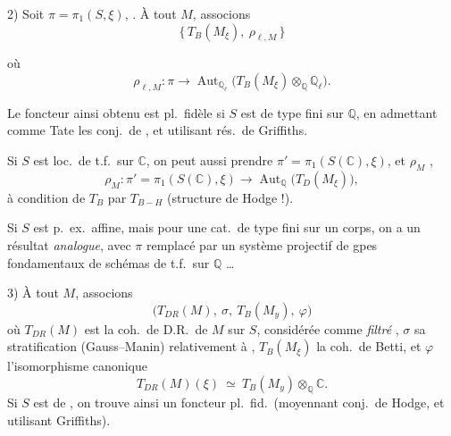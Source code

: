 \documentclass[11pt,a4paper]{article}
\begin{document}
2) Soit $\pi = \pi_{1}(S, \xi)$, . À tout $M$,
associons
\[ \{\, T_{B}(M_{\xi}),\ \rho_{\ell, M} \,\} \]

 où
\[ \rho_{\ell, M} : \pi \longrightarrow \operatorname{Aut}_{\mathbb{Q}_{\ell}}
\bigl( T_{B}(M_{\xi}) \otimes_{\mathbb{Q}} \mathbb{Q}_{\ell} \bigr) . \]


Le foncteur ainsi obtenu est pl.\ fidèle si $S$  est de type fini sur $\mathbb{Q}$, en admettant
comme  Tate les conj.\ de , et utilisant rés.\ de
Griffiths.

Si $S$ est loc.\ de t.f.\ sur $\mathbb{C}$, on peut aussi prendre
$\pi' = \pi_{1}(S(\mathbb{C}), \xi)$, et $\rho_{M}$ ,
\[ \rho_{M} : \pi' = \pi_{1}(S(\mathbb{C}), \xi) \longrightarrow
\operatorname{Aut}_{\mathbb{Q}} \bigl( T_{D}(M_{\xi}) \bigr) , \]
à condition de  $T_{B}$ par $T_{B-H}$ (structure de Hodge !).


Si $S$ est p.\ ex.\ affine, \struck{\ill{}} mais pour une cat.\ de type fini sur
un corps, on a un résultat \emph{analogue}, avec $\pi$ remplacé par un système
projectif de gpes fondamentaux de schémas de t.f.\ sur $\mathbb{Q}$ …

3) À tout $M$, associons
\[ \bigl( T_{DR}(M),\ \sigma,\ T_{B}(M_{y}),\ \varphi \bigr) \]
où $T_{DR}(M)$ est la coh.\ de D.R.\ de $M$ sur $S$, considérée comme
 \emph{filtré} , $\sigma$ sa stratification (Gauss--Manin) relativement à
\ill{} ,
$T_{B}(M_{\xi})$ la coh.\ de Betti, et $\varphi$ l'isomorphisme canonique
\[ T_{DR}(M)(\xi) \ \simeq \ T_{B}(M_{y}) \otimes_{\mathbb{Q}} \mathbb{C} . \]
Si $S$ est de \ill{}, on trouve ainsi un foncteur pl.\ fid.\ (moyennant conj.\ de
Hodge, et utilisant Griffiths).

\end{document}
